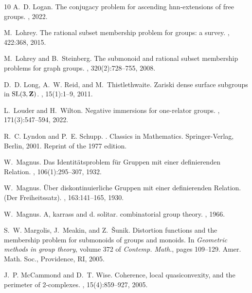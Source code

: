 \documentclass[11pt]{amsart}
\theoremstyle{plain}
\theoremstyle{definition}
\begin{document}
\begin{thebibliography}{10}
A.~D. Logan.
\newblock The conjugacy problem for ascending hnn-extensions of free groups.
, 2022.

M.~Lohrey.
\newblock The rational subset membership problem for groups: a survey.
, 422:368, 2015.

M.~Lohrey and B.~Steinberg.
\newblock The submonoid and rational subset membership problems for graph
  groups.
, 320(2):728--755, 2008.

D.~D. Long, A.~W. Reid, and M.~Thistlethwaite.
\newblock Zariski dense surface subgroups in {${\rm SL}(3,\bold Z)$}.
, 15(1):1--9, 2011.

L.~Louder and H.~Wilton.
\newblock Negative immersions for one-relator groups.
, 171(3):547--594, 2022.

R.~C. Lyndon and P.~E. Schupp.
.
\newblock Classics in Mathematics. Springer-Verlag, Berlin, 2001.
\newblock Reprint of the 1977 edition.

W.~Magnus.
\newblock Das {I}dentit\"{a}tsproblem f\"{u}r {G}ruppen mit einer definierenden
  {R}elation.
, 106(1):295--307, 1932.

W.~Magnus.
\newblock \"{U}ber diskontinuierliche {G}ruppen mit einer definierenden
  {R}elation. ({D}er {F}reiheitssatz).
, 163:141--165, 1930.

W.~Magnus.
\newblock A, karrass and d. solitar. combinatorial group theory.
, 1966.

S.~W. Margolis, J.~Meakin, and Z.~{\v{S}}unik.
\newblock Distortion functions and the membership problem for submonoids of
  groups and monoids.
\newblock In {\em Geometric methods in group theory}, volume 372 of {\em
  Contemp. Math.}, pages 109--129. Amer. Math. Soc., Providence, RI, 2005.

J.~P. McCammond and D.~T. Wise.
\newblock Coherence, local quasiconvexity, and the perimeter of 2-complexes.
, 15(4):859--927, 2005.


\end{thebibliography}
\end{document}

